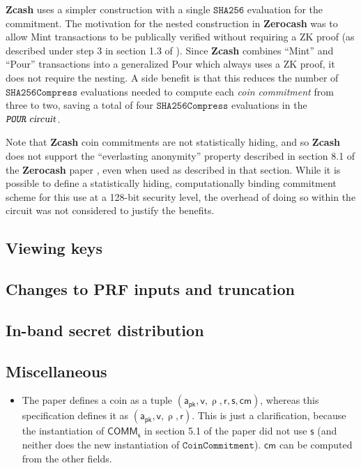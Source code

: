 \documentclass{article}
\newcommand{\todo}[1]{{\color{Sepia}\sf{TODO: #1}}}
\newcommand{\term}[1]{\textsl{#1}\xspace}
\newcommand{\termbf}[1]{\textbf{#1}\xspace}
\newcommand{\Zcash}{\termbf{Zcash}}
\newcommand{\Zerocash}{\termbf{Zerocash}}
\newcommand{\coinCommitment}{\term{coin commitment}}
\newcommand{\CRH}{\mathsf{CRH}}
\newcommand{\FullHash}{\mathtt{SHA256}}
\newcommand{\AuthPublic}{\mathsf{a_{pk}}}
\newcommand{\Value}{\mathsf{v}}
\newcommand{\CoinCommitRand}{\mathsf{r}}
\newcommand{\CoinAddressRand}{\mathsf{\uprho}}
\newcommand{\CoinCommitS}{\mathsf{s}}
\newcommand{\SHA}{\mathtt{SHA256Compress}}
\newcommand{\cm}{\mathsf{cm}}
\newcommand{\PourCircuit}{\term{\texttt{POUR} circuit}}
\newcommand{\COMM}[1]{\mathsf{COMM}_{#1}}
\newcommand{\CoinCommitment}{\mathtt{CoinCommitment}}
\begin{document}
\Zcash uses a simpler construction with a single $\FullHash$ evaluation
for the commitment. The motivation for the nested construction in \Zerocash
was to allow Mint transactions to be publically verified without requiring
a ZK proof (as described under step 3 in section 1.3 of
\cite{ZerocashOakland}). Since \Zcash combines ``Mint'' and ``Pour''
transactions into a generalized Pour which always uses a ZK proof, it
does not require the nesting. A side benefit is that this reduces the
number of $\SHA$ evaluations needed to compute each \coinCommitment from
three to two, saving a total of four $\SHA$ evaluations in the
$\PourCircuit$.

Note that \Zcash coin commitments are not statistically hiding, and
so \Zcash does not support the ``everlasting anonymity'' property
described in section 8.1 of the \Zerocash paper \cite{ZerocashOakland},
even when used as described in that section. While it is possible to
define a statistically hiding, computationally binding commitment scheme
for this use at a 128-bit security level, the overhead of doing so
within the circuit was not considered to justify the benefits.

\subsection{Viewing keys}

\todo{}

\subsection{Changes to PRF inputs and truncation}

\todo{}


\subsection{In-band secret distribution}

\todo{}

\subsection{Miscellaneous}

\begin{itemize}
    \item The paper defines a coin as a tuple $(\AuthPublic, \Value,
\CoinAddressRand, \CoinCommitRand, \CoinCommitS, \cm)$, whereas this specification
defines it as $(\AuthPublic, \Value, \CoinAddressRand, \CoinCommitRand)$.
This is just a clarification, because the instantiation of $\COMM{\CoinCommitS}$
in section 5.1 of the paper did not use $\CoinCommitS$ (and neither does the
new instantiation of $\CoinCommitment$). $\cm$ can be computed from the other
fields.
\end{itemize}
\end{document}
